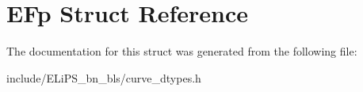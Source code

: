 \hypertarget{struct_e_fp}{}\section{E\+Fp Struct Reference}
\label{struct_e_fp}


The documentation for this struct was generated from the following file\+:\begin{DoxyCompactItemize}
\item 
include/\+E\+Li\+P\+S\+\_\+bn\+\_\+bls/curve\+\_\+dtypes.\+h\end{DoxyCompactItemize}
